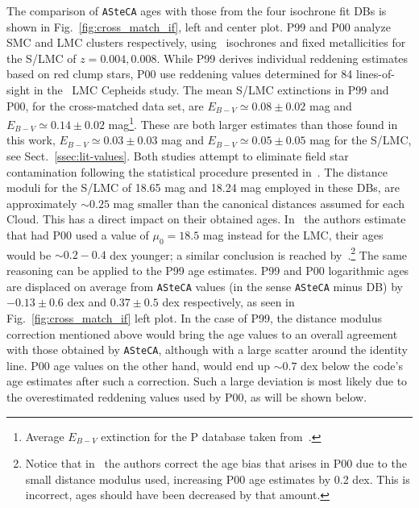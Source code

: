 \documentclass{aa}
\begin{document}
%
%
The comparison of \texttt{ASteCA} ages with those from the four isochrone
fit DBs is shown in Fig.~\ref{fig:cross_match_if}, left and center plot.
%
P99 and P00 analyze SMC and LMC clusters respectively,
using~\cite{Bertelli_1994} isochrones and fixed metallicities for the S/LMC of
$z{=}0.004, 0.008$. While P99 derives individual reddening estimates based on
red clump stars, P00 use reddening values determined for 84 lines-of-sight
in the~\cite{Udalski_1999} LMC Cepheids study. The mean S/LMC extinctions in P99
and P00, for the cross-matched data set, are $E_{B-V}{\simeq}0.08{\pm}0.02$ mag
and $E_{B-V}{\simeq}0.14 {\pm}0.02$ mag\footnote{Average $E_{B-V}$ extinction
for the P database taken from~\cite{de_Grijs_2006}.}. These are both larger
estimates than those found in this work, $E_{B-V}{\simeq}0.03{\pm}0.03$ mag and
$E_{B-V}{\simeq}0.05{\pm}0.05$ mag for the S/LMC, see
Sect.~\ref{ssec:lit-values}.
%
Both studies attempt to eliminate field star contamination following the
statistical procedure presented in~\cite{Mateo_1986}.
The distance moduli for the S/LMC of 18.65 mag and 18.24 mag employed in
these DBs, are approximately ${\sim}0.25$ mag smaller than the canonical
distances assumed for each Cloud. This has a direct impact on their obtained
ages.
%
In~\cite{de_Grijs_2006} the authors estimate that had P00 used a value
of $\mu_0{=}18.5$ mag instead for the LMC, their ages would be ${\sim}0.2{-}0.4$
dex younger; a similar conclusion is reached
by~\cite{Baumgardt_2013}.\footnote{Notice that in~\cite{Baumgardt_2013} the
authors correct the age bias that arises in P00 due to the small distance
modulus used, increasing P00 age estimates by 0.2 dex. This is incorrect, ages
should have been decreased by that amount.} The same reasoning can be applied to
the P99 age estimates.\@
%
P99 and P00 logarithmic ages are displaced on average from \texttt{ASteCA}
values (in the sense \texttt{ASteCA} minus DB) by $-0.13{\pm}0.6$ dex and $0.37
{\pm}0.5$ dex respectively, as seen in Fig.~\ref{fig:cross_match_if} left plot.
In the case of P99, the distance modulus correction mentioned above would
bring the age values to an overall agreement with those obtained by
\texttt{ASteCA}, although with a large scatter around the identity line.
%
P00 age values on the other hand, would end up ${\sim}0.7$ dex below the code's
age estimates after such a correction. Such a large deviation is most likely due
to the overestimated reddening values used by P00, as will be shown below.
\end{document}
